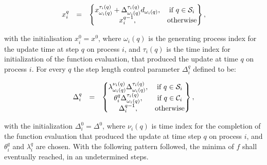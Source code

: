 	\begin{equation}
        \begin{array}{rcl}
            x_i^q&=&\begin{Bmatrix}
                x_{\omega_i(q)}^{\tau_i(q)}+\Delta_{\omega_i(q)}^{\tau_i(q)}d_{\omega_i(q)},&\textnormal{if }q\in\mathcal{S}_i\\
                x_i^{q-1},&\textnormal{otherwise}\\
            \end{Bmatrix},\\
        \end{array}
        \label{BSIC:equ:APPS_x}
    \end{equation}
		
		with the initialisation $x^0_i=x^0$, where $\omega_i(q)$ is the generating process index for the update time at step $q$ on process $i$, and $\tau_i(q)$ is the time index for initialization of the function evaluation, that produced the update at time $q$ on process $i$. For every $q$ the step length control parameter $\Delta_i^q$ defined to be:
		
		\begin{equation}
        \begin{array}{rcl}
            \Delta_i^q&=&\begin{Bmatrix}
                \lambda_{\omega_i(q)}^{\nu_i(q)}\Delta_{\omega_i(q)}^{\tau_i(q)},&\textnormal{if }q\in\mathcal{S}_i\\
								\theta_{i}^{q}\Delta_{\omega_i(q)}^{\tau_i(q)},&\textnormal{if }q\in\mathcal{C}_i\\
                \Delta_i^{q-1},&\textnormal{otherwise}\\
            \end{Bmatrix},\\
        \end{array}
        \label{BSIC:equ:APPS_Delta}
    \end{equation}
		
		with the initialization $\Delta^0_i=\Delta^0$, where $\nu_i(q)$ is  time index for the completion of the function evaluation that produced the update at time step $q$ on process $i$, and $\theta_i^q$ and $\lambda_i^q$ are chosen. With the following pattern followed, the minima of $f$ shall eventually reached, in an undetermined steps. 
